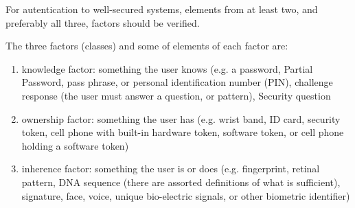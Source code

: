 For autentication to well-secured systems, elements from at least two, and preferably all three, factors should be verified.

The three factors (classes) and some of elements of each factor are:

\begin{enumerate}

    \item knowledge factor: something the user knows (e.g. a password, Partial Password, pass phrase, or personal identification number (PIN), challenge response (the user must answer a question, or pattern), Security question

    \item ownership factor: something the user has (e.g. wrist band, ID card, security token, cell phone with built-in hardware token, software token, or cell phone holding a software token)

    \item inherence factor: something the user is or does (e.g. fingerprint, retinal pattern, DNA sequence (there are assorted definitions of what is sufficient), signature, face, voice, unique bio-electric signals, or other biometric identifier)

\end{enumerate}




